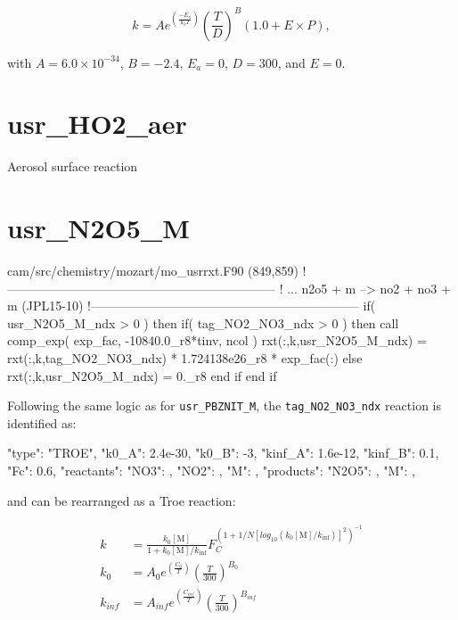 \documentclass[titlepage]{article}
\begin{document}
\begin{equation}
k = Ae^{(\frac{-E_a}{k_bT})}(\frac{T}{D})^B(1.0+E \times P),
\end{equation}

\noindent with $A = 6.0 \times 10^{-34}$, $B = -2.4$, $E_a = 0$, $D = 300$, and $E = 0$.


\section{usr\_HO2\_aer}

Aerosol surface reaction


\section{usr\_N2O5\_M}

\begin{blockcode}[commandchars=\\\{\}]
\color{gray}cam/src/chemistry/mozart/mo_usrrxt.F90 (849,859)
!-----------------------------------------------------------------
! ... n2o5 + m --> no2 + no3 + m (JPL15-10)
!-----------------------------------------------------------------
       if( usr_N2O5_M_ndx > 0 ) then
          if( tag_NO2_NO3_ndx > 0 ) then
             call comp_exp( exp_fac, -10840.0_r8*tinv, ncol )
             rxt(:,k,usr_N2O5_M_ndx) = rxt(:,k,tag_NO2_NO3_ndx) * 1.724138e26_r8 * exp_fac(:)
          else
             rxt(:,k,usr_N2O5_M_ndx) = 0._r8
          end if
       end if
\end{blockcode}

Following the same logic as for \verb>usr_PBZNIT_M>, the \verb>tag_NO2_NO3_ndx> reaction is identified as:

\begin{blockcode}
        {
          "type": "TROE",
          "k0_A": 2.4e-30,
          "k0_B": -3,
          "kinf_A": 1.6e-12,
          "kinf_B": 0.1,
          "Fc": 0.6,
          "reactants": {
            "NO3": { },
            "NO2": { },
            "M": { }
          },
          "products": {
            "N2O5": { },
            "M": { }
          }
        },
\end{blockcode}

\noindent and can be rearranged as a Troe reaction:

\begin{equation}
\begin{split}
k & = \frac{k_0[\mbox{M}]}{1+k_0[\mbox{M}]/k_{\inf}}F_C^{(1+1/N[log_{10}(k_0[\mbox{M}]/k_{\inf})]^2)^{-1}} \\
k_0 & = A_0 e^{\left( \frac{C_0}{T} \right)} \left( \frac{T}{300} \right)^{B_0} \\
k_{inf} & = A_{inf} e^{\left( \frac{C_{inf}}{T} \right)} \left( \frac{T}{300} \right)^{B_{inf}}
\end{split}
\end{equation}
\end{document}
